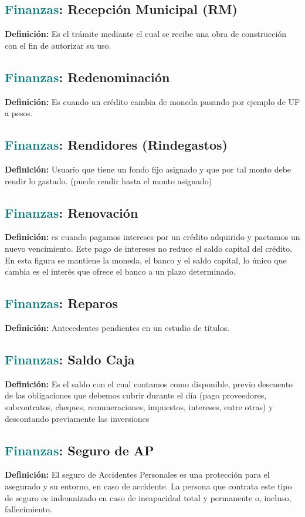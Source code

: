 \documentclass[12pt]{article}
\begin{document}
\subsection{\textcolor{teal}{Finanzas}: Recepción Municipal (RM)}
\textbf{Definición:} Es el trámite mediante el cual se recibe una obra de construcción con el fin de autorizar su uso.
\subsection{\textcolor{teal}{Finanzas}: Redenominación}
\textbf{Definición:} Es cuando un crédito cambia de moneda pasando por ejemplo de UF a pesos.
\subsection{\textcolor{teal}{Finanzas}: Rendidores (Rindegastos)}
\textbf{Definición:} Usuario que tiene un fondo fijo asignado y que por tal monto debe rendir lo gastado. (puede rendir hasta el monto asignado)
\subsection{\textcolor{teal}{Finanzas}: Renovación}
\textbf{Definición:} es cuando pagamos intereses por un crédito adquirido y pactamos un nuevo vencimiento. Este pago de intereses no reduce el saldo capital del crédito. En esta figura se mantiene la moneda, el banco y el saldo capital, lo único que cambia es el interés que ofrece el banco a un plazo determinado.
\subsection{\textcolor{teal}{Finanzas}: Reparos}
\textbf{Definición:} Antecedentes pendientes en un estudio de títulos.
\subsection{\textcolor{teal}{Finanzas}: Saldo Caja}
\textbf{Definición:} Es el saldo con el cual contamos como disponible, previo descuento de las obligaciones que debemos cubrir durante el día (pago proveedores, subcontratos, cheques, remuneraciones, impuestos, intereses, entre otras) y descontando previamente las inversiones
\subsection{\textcolor{teal}{Finanzas}: Seguro de AP}
\textbf{Definición:} El seguro de Accidentes Personales es una protección para el asegurado y su entorno, en caso de accidente. La persona que contrata este tipo de seguro es indemnizado en caso de incapacidad total y permanente o, incluso, fallecimiento.
\end{document}
